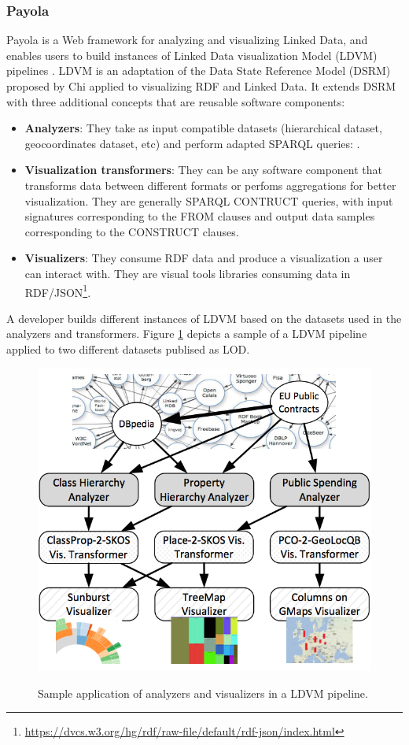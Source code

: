 \subsubsection{Payola}
Payola \cite{payola13} is a Web framework for analyzing and visualizing Linked Data, and enables users to build instances of Linked Data visualization Model (LDVM) pipelines \cite{brunetti13}. LDVM is an adaptation of the Data State Reference Model (DSRM) proposed by Chi \cite{chi2000} applied to visualizing RDF and Linked Data. It extends DSRM with three additional concepts that are reusable software components:
\begin{itemize}
\item \textbf{Analyzers}: They take as input compatible datasets (hierarchical dataset, geocoordinates dataset, etc) and perform adapted SPARQL queries: .
\item \textbf{Visualization transformers}: They can be any software component that transforms data between different formats or perfoms aggregations for better visualization. They are generally SPARQL CONTRUCT queries, with input signatures corresponding to the FROM clauses and output data samples corresponding to the CONSTRUCT clauses.
\item \textbf{Visualizers}: They consume RDF data and produce a visualization a user can interact with. They are visual tools libraries consuming data in RDF/JSON\footnote{\url{https://dvcs.w3.org/hg/rdf/raw-file/default/rdf-json/index.html}}.
\end{itemize}
A developer builds different instances of LDVM based on the datasets used in the analyzers and transformers. Figure \ref{fig:ldvm-lod} depicts a sample of a LDVM pipeline applied to two different datasets publised as LOD.

\begin{figure}
\center
\includegraphics[scale=0.8]{img/ldvm-lod.png}
\label{fig:ldvm-lod}
\caption{Sample application of analyzers and visualizers in a LDVM pipeline.}
\end{figure}


